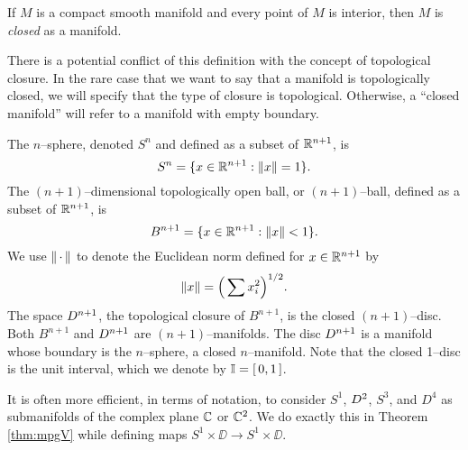%	
%
	
\begin{defn}
	If $M$ is a compact smooth manifold and every point of $M$ is interior, then $M$ is \emph{closed} as a manifold.
\end{defn}

There is a potential conflict of this definition with the concept of topological closure.
In the rare case that we want to say that a manifold is topologically closed, we will specify that the type of closure is topological.
Otherwise, a ``closed manifold'' will refer to a manifold with empty boundary.

\begin{ex}
	The $n$--sphere, denoted $S^n$ and defined as a subset of $\mathbb{R}^{n+1}$, is
	\[
	S^n = \{x\in\mathbb{R}^{n+1}:\left\lVert x \right\rVert=1\}.
	\]
	The $(n+1)$--dimensional topologically open ball, or $(n+1)$--ball, defined as a subset of $\mathbb{R}^{n+1}$, is
	\[
	B^{n+1} = \{x\in\mathbb{R}^{n+1}:\left\lVert x \right\rVert< 1\}.
	\]
	We use $\left\lVert \,\cdot\, \right\rVert$ to denote the Euclidean norm defined for $x\in\mathbb{R}^{n+1}$ by
	\[
	\left\lVert x \right\rVert = \Big( \sum x_i^2 \Big)^{1/2}.
	\]
	The space $D^{n+1}$, the topological closure of $B^{n+1}$, is the closed $(n+1)$--disc.
	Both $B^{n+1}$ and $D^{n+1}$ are $(n+1)$--manifolds.
	The disc $D^{n+1}$ is a manifold whose boundary is the $n$--sphere, a closed $n$--manifold.
	Note that the closed 1--disc is the unit interval, which we denote by $\mathbb{I}=[\,0,1\,]$.
	
	It is often more efficient, in terms of notation, to consider $S^1$, $D^2$, $S^3$, and $D^4$ as submanifolds of the complex plane $\mathbb{C}$ or $\mathbb{C}^2$.
	We do exactly this in Theorem \ref{thm:mpgV} while defining maps $S^1\times\DD\to S^1\times\DD$.
\end{ex}

